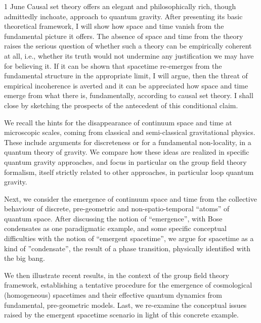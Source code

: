 \documentclass{conference}
\begin{document}
\begin{Day}{1 June}
{Causal set theory offers an elegant and philosophically rich, though admittedly inchoate, approach to quantum gravity. After presenting its basic theoretical framework, I will show how space and time vanish from the fundamental picture it offers. The absence of space and time from the theory raises the serious question of whether such a theory can be empirically coherent at all, i.e., whether its truth would not undermine any justification we may have for believing it. If it can be shown that spacetime re-emerges from the fundamental structure in the appropriate limit, I will argue, then the threat of empirical incoherence is averted and it can be appreciated how space and time emerge from what there is, fundamentally, according to causal set theory. I shall close by sketching the prospects of the antecedent of this conditional claim. }

  {We recall the hints for the disappearance of continuum space and time at microscopic scales, coming from classical and semi-classical gravitational physics. These include arguments for discreteness or for a fundamental non-locality, in a quantum theory of gravity. We compare how these ideas are realized in specific quantum gravity approaches, and focus in particular on the group field theory formalism, itself strictly related to other approaches, in particular loop quantum gravity.

Next, we consider the emergence of continuum space and time from the collective behaviour of discrete, pre-geometric and non-spatio-temporal “atoms” of quantum space. After discussing the notion of “emergence”, with Bose condensates as one paradigmatic example, and some specific conceptual difficulties with the notion of “emergent spacetime”, we argue for spacetime as a kind of ”condensate”, the result of a phase transition, physically identified with the big bang.

We then illustrate recent results, in the context of the group field theory framework, establishing a tentative procedure for the emergence of cosmological (homogeneous) spacetimes and their effective quantum dynamics from fundamental, pre-geometric models.
Last, we re-examine the conceptual issues raised by the emergent spacetime scenario in light of this concrete example.}


\end{Day}
\end{document}
